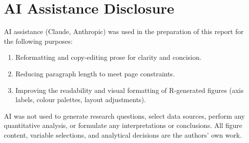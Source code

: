\documentclass[12pt, a4paper]{report}
\begin{document}







\section*{AI Assistance Disclosure}
AI assistance (Claude, Anthropic) was used in the preparation of this report for the following purposes:
\begin{enumerate}
    \item Reformatting and copy-editing prose for clarity and concision.
    \item Reducing paragraph length to meet page constraints.
    \item Improving the readability and visual formatting of R-generated figures (axis labels, colour palettes, layout adjustments).
\end{enumerate}
AI was not used to generate research questions, select data sources, perform any quantitative analysis, or formulate any interpretations or conclusions. All figure content, variable selections, and analytical decisions are the authors' own work.
\end{document}
